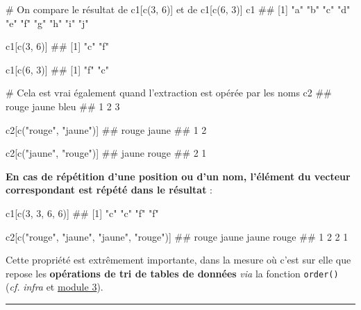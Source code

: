 \documentclass[12pt,twosided, notitlepage]{book}
\newenvironment{Shaded}{}{}
\newcommand{\CommentTok}[1]{\textcolor[rgb]{0.00,0.50,0.00}{#1}}
\newcommand{\DecValTok}[1]{#1}
\newcommand{\KeywordTok}[1]{\textcolor[rgb]{0.00,0.00,1.00}{#1}}
\newcommand{\NormalTok}[1]{#1}
\newcommand{\StringTok}[1]{\textcolor[rgb]{0.00,0.50,0.50}{#1}}
\renewenvironment{Shaded}{\begin{snugshade}}{\end{snugshade}}
\begin{document}
\begin{Shaded}
\begin{Highlighting}[]
\CommentTok{# On compare le résultat de c1[c(3, 6)] et de c1[c(6, 3)]}
\NormalTok{c1}
\NormalTok{  ##  [1] "a" "b" "c" "d" "e" "f" "g" "h" "i" "j"}

\NormalTok{c1[}\KeywordTok{c}\NormalTok{(}\DecValTok{3}\NormalTok{, }\DecValTok{6}\NormalTok{)]}
\NormalTok{  ## [1] "c" "f"}

\NormalTok{c1[}\KeywordTok{c}\NormalTok{(}\DecValTok{6}\NormalTok{, }\DecValTok{3}\NormalTok{)]}
\NormalTok{  ## [1] "f" "c"}

\CommentTok{# Cela est vrai également quand l'extraction est opérée par les noms}
\NormalTok{c2}
\NormalTok{  ## rouge jaune  bleu }
\NormalTok{  ##     1     2     3}

\NormalTok{c2[}\KeywordTok{c}\NormalTok{(}\StringTok{"rouge"}\NormalTok{, }\StringTok{"jaune"}\NormalTok{)]}
\NormalTok{  ## rouge jaune }
\NormalTok{  ##     1     2}

\NormalTok{c2[}\KeywordTok{c}\NormalTok{(}\StringTok{"jaune"}\NormalTok{, }\StringTok{"rouge"}\NormalTok{)]}
\NormalTok{  ## jaune rouge }
\NormalTok{  ##     2     1}
\end{Highlighting}
\end{Shaded}

\textbf{En cas de répétition d'une position ou d'un nom, l'élément du
vecteur correspondant est répété dans le résultat} :

\begin{Shaded}
\begin{Highlighting}[]
\NormalTok{c1[}\KeywordTok{c}\NormalTok{(}\DecValTok{3}\NormalTok{, }\DecValTok{3}\NormalTok{, }\DecValTok{6}\NormalTok{, }\DecValTok{6}\NormalTok{)]}
\NormalTok{  ## [1] "c" "c" "f" "f"}

\NormalTok{c2[}\KeywordTok{c}\NormalTok{(}\StringTok{"rouge"}\NormalTok{, }\StringTok{"jaune"}\NormalTok{, }\StringTok{"jaune"}\NormalTok{, }\StringTok{"rouge"}\NormalTok{)]}
\NormalTok{  ## rouge jaune jaune rouge }
\NormalTok{  ##     1     2     2     1}
\end{Highlighting}
\end{Shaded}

Cette propriété est extrêmement importante, dans la mesure où c'est sur
elle que repose les \textbf{opérations de tri de tables de données}
\emph{via} la fonction \texttt{order()} (\emph{cf.} \emph{infra} et
\underline{module 3}).

\begin{center}\rule{0.5\linewidth}{\linethickness}\end{center}
\end{document}

